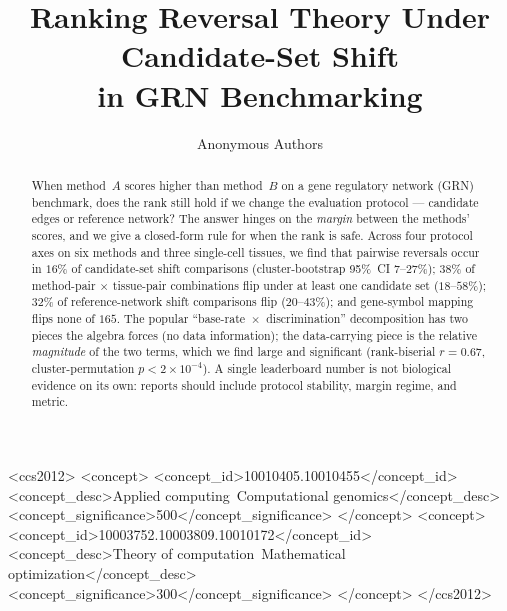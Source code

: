 \documentclass[sigconf,anonymous]{acmart}
\begin{document}
\title{Ranking Reversal Theory Under Candidate-Set Shift\\in GRN Benchmarking}

\author{Anonymous Authors}

\begin{abstract}
When method~$A$ scores higher than method~$B$ on a gene regulatory
network (GRN) benchmark, does the rank still hold if we change the
evaluation protocol --- candidate edges or reference network? The answer
hinges on the \emph{margin} between the methods' scores, and we give a
closed-form rule for when the rank is safe. Across four protocol axes
on six methods and three single-cell tissues, we find that pairwise
reversals occur in $16\%$ of candidate-set shift comparisons (cluster-bootstrap
95\%~CI $7$--$27\%$); $38\%$ of method-pair $\times$ tissue-pair combinations
flip under at least one candidate set ($18$--$58\%$); $32\%$ of
reference-network shift comparisons flip ($20$--$43\%$); and gene-symbol
mapping flips none of $165$. The popular
``base-rate~$\times$~discrimination'' decomposition has two pieces the
algebra forces (no data information); the data-carrying piece is the
relative \emph{magnitude} of the two terms, which we find large and
significant (rank-biserial $r = 0.67$, cluster-permutation
$p < 2\!\times\!10^{-4}$). A single leaderboard number is not biological
evidence on its own: reports should include protocol stability, margin
regime, and metric.
\end{abstract}

\begin{CCSXML}
<ccs2012>
<concept>
<concept_id>10010405.10010455</concept_id>
<concept_desc>Applied computing~Computational genomics</concept_desc>
<concept_significance>500</concept_significance>
</concept>
<concept>
<concept_id>10003752.10003809.10010172</concept_id>
<concept_desc>Theory of computation~Mathematical optimization</concept_desc>
<concept_significance>300</concept_significance>
</concept>
</ccs2012>
\end{CCSXML}



\maketitle
\end{document}
